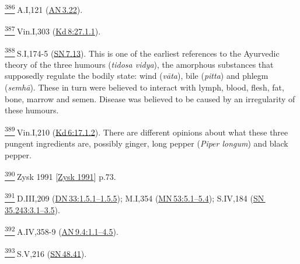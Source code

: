 \label{footprints_split_024.html_fn386}
\hyperref[footprints_split_011.htmlux5cux23fnref386]{\textsuperscript{386}} A.I,121
(\href{https://suttacentral.net/an3.22/en/sujato}{AN\,3.22}).

\label{footprints_split_024.html_fn387}
\hyperref[footprints_split_011.htmlux5cux23fnref387]{\textsuperscript{387}} Vin.I,303
(\href{https://suttacentral.net/pli-tv-kd8/en/brahmali?\#27.1.1}{Kd\,8:27.1.1}).

\label{footprints_split_024.html_fn388}
\hyperref[footprints_split_011.htmlux5cux23fnref388]{\textsuperscript{388}} S.I,174-5
(\href{https://suttacentral.net/sn7.13/en/sujato}{SN\,7.13}). This is
one of the earliest references to the Ayurvedic theory of the three
humours (\emph{tidosa vidya}), the amorphous substances that supposedly
regulate the bodily state: wind (\emph{vāta}), bile (\emph{pitta}) and
phlegm (\emph{semhā}). These in turn were believed to interact with
lymph, blood, flesh, fat, bone, marrow and semen. Disease was believed
to be caused by an irregularity of these humours.

\label{footprints_split_024.html_fn389}
\hyperref[footprints_split_011.htmlux5cux23fnref389]{\textsuperscript{389}} Vin.I,210
(\href{https://suttacentral.net/pli-tv-kd6/en/brahmali?\#17.1.2}{Kd\,6:17.1.2}).
There are different opinions about what these three pungent ingredients
are, possibly ginger, long pepper (\emph{Piper longum}) and black
pepper.

\label{footprints_split_024.html_fn390}
\hyperref[footprints_split_011.htmlux5cux23fnref390]{\textsuperscript{390}} {Zysk
1991
{{[}\hyperref[footprints_split_022.htmlux5cux23Zyskux5cux25201991]{Zysk
1991}{]}}} p.73.

\label{footprints_split_024.html_fn391}
\hyperref[footprints_split_011.htmlux5cux23fnref391]{\textsuperscript{391}} D.III,209
(\href{https://suttacentral.net/dn33/en/sujato\#1.5.1}{DN\,33:1.5.1--1.5.5});
M.I,354
(\href{https://suttacentral.net/mn53/en/sujato\#5.1}{MN\,53:5.1--5.4});
S.IV,184
(\href{https://suttacentral.net/sn35.243/en/sujato\#3.1}{SN\,35.243:3.1--3.5}).

\label{footprints_split_024.html_fn392}
\hyperref[footprints_split_011.htmlux5cux23fnref392]{\textsuperscript{392}} A.IV,358-9
(\href{https://suttacentral.net/an9.4/en/sujato\#1.1}{AN\,9.4:1.1--4.5}).

\label{footprints_split_024.html_fn393}
\hyperref[footprints_split_011.htmlux5cux23fnref393]{\textsuperscript{393}} S.V,216
(\href{https://suttacentral.net/sn48.41/en/sujato}{SN\,48.41}).

